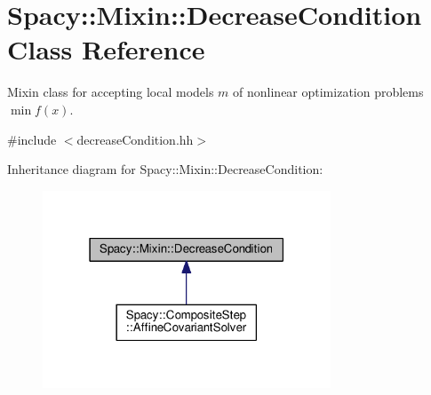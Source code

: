 \hypertarget{classSpacy_1_1Mixin_1_1DecreaseCondition}{}\section{Spacy\+:\+:Mixin\+:\+:Decrease\+Condition Class Reference}
\label{classSpacy_1_1Mixin_1_1DecreaseCondition}


Mixin class for accepting local models $m$ of nonlinear optimization problems $\min f(x)$.  




{\ttfamily \#include $<$decrease\+Condition.\+hh$>$}



Inheritance diagram for Spacy\+:\+:Mixin\+:\+:Decrease\+Condition\+:\nopagebreak
\begin{figure}[H]
\begin{center}
\leavevmode
\includegraphics[width=243pt]{classSpacy_1_1Mixin_1_1DecreaseCondition__inherit__graph}
\end{center}
\end{figure}
